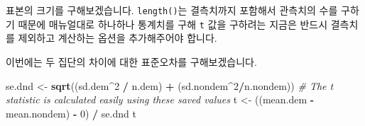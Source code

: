 \documentclass[]{book}
\newenvironment{Shaded}{\begin{snugshade}}{\end{snugshade}}
\newcommand{\CommentTok}[1]{\textcolor[rgb]{0.56,0.35,0.01}{\textit{#1}}}
\newcommand{\DecValTok}[1]{\textcolor[rgb]{0.00,0.00,0.81}{#1}}
\newcommand{\KeywordTok}[1]{\textcolor[rgb]{0.13,0.29,0.53}{\textbf{#1}}}
\newcommand{\NormalTok}[1]{#1}
\newcommand{\OperatorTok}[1]{\textcolor[rgb]{0.81,0.36,0.00}{\textbf{#1}}}
\newcommand{\OtherTok}[1]{\textcolor[rgb]{0.56,0.35,0.01}{#1}}
\newcommand{\StringTok}[1]{\textcolor[rgb]{0.31,0.60,0.02}{#1}}
\begin{document}
표본의 크기를 구해보겠습니다. \texttt{length()}는 결측치까지 포함해서 관측치의 수를 구하기 때문에 매뉴얼대로 하나하나 통계치를 구해 \texttt{t} 값을 구하려는 지금은 반드시 결측치를 제외하고 계산하는 옵션을 추가해주어야 합니다.

\begin{Shaded}
\end{Shaded}

이번에는 두 집단의 차이에 대한 표준오차를 구해보겠습니다.

\begin{Shaded}
\begin{Highlighting}[]
\NormalTok{se.dnd <-}\StringTok{ }\KeywordTok{sqrt}\NormalTok{((sd.dem}\OperatorTok{^}\DecValTok{2} \OperatorTok{/}\StringTok{ }\NormalTok{n.dem) }\OperatorTok{+}\StringTok{ }\NormalTok{(sd.nondem}\OperatorTok{^}\DecValTok{2}\OperatorTok{/}\NormalTok{n.nondem))}
\CommentTok{# The t statistic is calculated easily using these saved values}
\NormalTok{t <-}\StringTok{ }\NormalTok{((mean.dem }\OperatorTok{-}\StringTok{ }\NormalTok{mean.nondem) }\OperatorTok{-}\StringTok{ }\DecValTok{0}\NormalTok{) }\OperatorTok{/}\StringTok{ }\NormalTok{se.dnd}
\NormalTok{t}
\end{Highlighting}
\end{Shaded}
\end{document}
